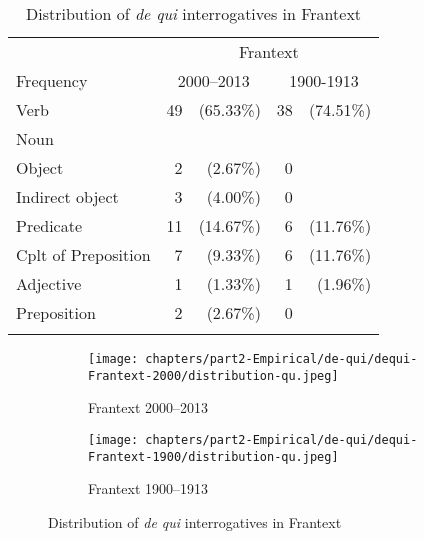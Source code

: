 \begin{table}
    \begin{tabular}{l *2{r@{~}r}}
         \lsptoprule
                   & \multicolumn{4}{c}{Frantext}\\\cmidrule(lr){2-5}
         Frequency & \multicolumn{2}{c}{2000--2013} & \multicolumn{2}{c}{1900-1913} \\\midrule
         Verb & 49 & (65.33\%) & 38 & (74.51\%) \\
         Noun & & \\
         \quad Object              & 2  & (2.67\%) & 0 & \\
         \quad Indirect object     & 3  & (4.00\%) & 0 & \\
         \quad Predicate           & 11 & (14.67\%) & 6 & (11.76\%) \\
         \quad Cplt of Preposition & 7  & (9.33\%)  & 6 & (11.76\%) \\
         Adjective & 1 & (1.33\%) & 1 & (1.96\%) \\
         Preposition & 2 & (2.67\%) & 0 &\\
         \lspbottomrule
    \end{tabular}
    \caption{Distribution of \emph{de qui} interrogatives in Frantext}
    \label{tab:dq2000-wh}
\end{table}

\begin{figure}
    \begin{subfigure}[b]{.49\textwidth}
    \texttt{[image: chapters/part2-Empirical/de-qui/dequi-Frantext-2000/distribution-qu.jpeg]}
    \caption{Frantext 2000--2013}
    \end{subfigure}
    \begin{subfigure}[b]{.49\textwidth}
    \texttt{[image: chapters/part2-Empirical/de-qui/dequi-Frantext-1900/distribution-qu.jpeg]}
    \caption{Frantext 1900--1913}
    \end{subfigure}
    \caption{Distribution of \emph{de qui} interrogatives in Frantext}
    \label{fig:dequi-d2000+1900-wh}
\end{figure}

